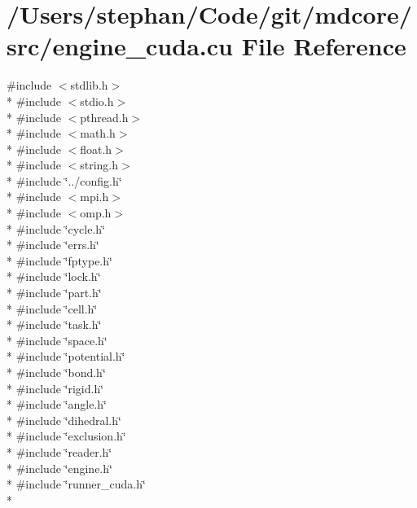 \hypertarget{engine__cuda_8cu}{\section{/\-Users/stephan/\-Code/git/mdcore/src/engine\-\_\-cuda.cu File Reference}
\label{engine__cuda_8cu}
}
{\ttfamily \#include $<$stdlib.\-h$>$}\\*
{\ttfamily \#include $<$stdio.\-h$>$}\\*
{\ttfamily \#include $<$pthread.\-h$>$}\\*
{\ttfamily \#include $<$math.\-h$>$}\\*
{\ttfamily \#include $<$float.\-h$>$}\\*
{\ttfamily \#include $<$string.\-h$>$}\\*
{\ttfamily \#include \char`\"{}../config.\-h\char`\"{}}\\*
{\ttfamily \#include $<$mpi.\-h$>$}\\*
{\ttfamily \#include $<$omp.\-h$>$}\\*
{\ttfamily \#include \char`\"{}cycle.\-h\char`\"{}}\\*
{\ttfamily \#include \char`\"{}errs.\-h\char`\"{}}\\*
{\ttfamily \#include \char`\"{}fptype.\-h\char`\"{}}\\*
{\ttfamily \#include \char`\"{}lock.\-h\char`\"{}}\\*
{\ttfamily \#include \char`\"{}part.\-h\char`\"{}}\\*
{\ttfamily \#include \char`\"{}cell.\-h\char`\"{}}\\*
{\ttfamily \#include \char`\"{}task.\-h\char`\"{}}\\*
{\ttfamily \#include \char`\"{}space.\-h\char`\"{}}\\*
{\ttfamily \#include \char`\"{}potential.\-h\char`\"{}}\\*
{\ttfamily \#include \char`\"{}bond.\-h\char`\"{}}\\*
{\ttfamily \#include \char`\"{}rigid.\-h\char`\"{}}\\*
{\ttfamily \#include \char`\"{}angle.\-h\char`\"{}}\\*
{\ttfamily \#include \char`\"{}dihedral.\-h\char`\"{}}\\*
{\ttfamily \#include \char`\"{}exclusion.\-h\char`\"{}}\\*
{\ttfamily \#include \char`\"{}reader.\-h\char`\"{}}\\*
{\ttfamily \#include \char`\"{}engine.\-h\char`\"{}}\\*
{\ttfamily \#include \char`\"{}runner\-\_\-cuda.\-h\char`\"{}}\\*
